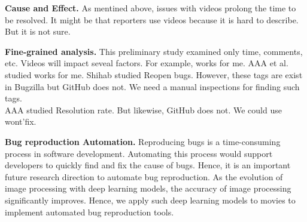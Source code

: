 \noindent
\textbf{Cause and Effect. }
As mentined above, issues with videos prolong the time to be resolved. It might be that reporters use videos because it is hard to describe. But it is not sure. 

\noindent
\textbf{Fine-grained analysis. }
This preliminary study examined only time, comments, etc. Videos will impact seveal factors. For example, works for me. AAA et al. studied works for me. Shihab studied Reopen bugs. However, these tags are exist in Bugzilla  but GitHub does not. We need a manual inspections for finding such tags. 
\\
AAA studied Resolution rate. But likewise, GitHub does not. We could use wont'fix. 


\noindent
\textbf{Bug reproduction Automation.}
Reproducing bugs is a time-consuming process 
in software development.
Automating this process would support developers 
to quickly find and fix the cause of bugs. 
Hence, it is an important future research direction 
to automate bug reproduction. 
As the evolution of image processing with deep learning models, 
the accuracy of image processing significantly improves. 
Hence, we apply such deep learning models to movies 
to implement automated bug reproduction tools. 





%  


